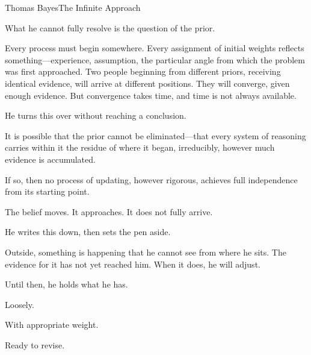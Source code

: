 \begin{formalecho}{Thomas Bayes}{The Infinite Approach}
\medskip

What he cannot fully resolve is the question of the prior.

Every process must begin somewhere. Every assignment of initial
weights reflects something---experience, assumption, the particular
angle from which the problem was first approached. Two people
beginning from different priors, receiving identical evidence, will
arrive at different positions. They will converge, given enough
evidence. But convergence takes time, and time is not always
available.

He turns this over without reaching a conclusion.

It is possible that the prior cannot be eliminated---that every
system of reasoning carries within it the residue of where it
began, irreducibly, however much evidence is accumulated.

If so, then no process of updating, however rigorous, achieves
full independence from its starting point.

The belief moves. It approaches. It does not fully arrive.

He writes this down, then sets the pen aside.

Outside, something is happening that he cannot see from where he
sits. The evidence for it has not yet reached him. When it does,
he will adjust.

Until then, he holds what he has.

Loosely.

With appropriate weight.

Ready to revise.

\end{formalecho}
